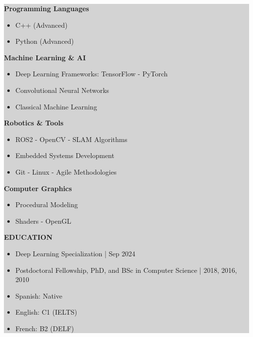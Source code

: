 \documentclass[11pt,a4paper]{article}
\newcommand{\cvheading}[1]{\smallskip\noindent\textbf{\large\color{headerblue} #1}\smallskip}
\newcommand{\cvsubheading}[1]{\smallskip\noindent\textbf{#1}}
\begin{document}
\noindent\colorbox{lightgrey}{%
\begin{minipage}[c]{0.3\linewidth}

\cvsubheading{Programming Languages}
\begin{itemize}[leftmargin=*,nosep]
\item C++ (Advanced)
\item Python (Advanced)
\end{itemize}

\cvsubheading{Machine Learning \& AI}
\begin{itemize}[leftmargin=*,nosep]
\item Deep Learning Frameworks: TensorFlow - PyTorch
\item Convolutional Neural Networks
\item Classical Machine Learning
\end{itemize}

\cvsubheading{Robotics \& Tools}
\begin{itemize}[leftmargin=*,nosep]
\item ROS2 - OpenCV - SLAM Algorithms
\item Embedded Systems Development
\item Git - Linux - Agile Methodologies
\end{itemize}

\cvsubheading{Computer Graphics}
\begin{itemize}[leftmargin=*,nosep]
\item Procedural Modeling
\item Shaders - OpenGL
\end{itemize}

\noindent \hrulefill

\cvheading{EDUCATION}
\begin{itemize}[leftmargin=*,nosep]
\item Deep Learning Specialization | Sep 2024
\item Postdoctoral Fellowship, PhD, and BSc in Computer Science | 2018, 2016, 2010
\end{itemize}

\noindent \hrulefill

\begin{itemize}[leftmargin=*,nosep]
\item Spanish: Native
\item English: C1 (IELTS)
\item French: B2 (DELF)
\end{itemize}

\end{minipage}}
\end{document}
